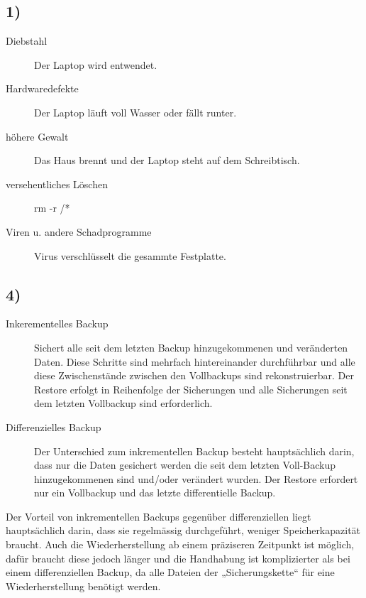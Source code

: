 \documentclass[ngerman]{fbi-aufgabenblatt}
\begin{document}
\setcounter{section}{0}
   


\subsection*{1)}
\begin{description}
	\item[Diebstahl] Der Laptop wird entwendet.
	\item [Hardwaredefekte] Der Laptop läuft voll Wasser oder fällt runter.
	\item [höhere Gewalt] Das Haus brennt und der Laptop steht auf dem Schreibtisch.
	\item [versehentliches Löschen] rm -r /*
	\item[Viren u. andere Schadprogramme] Virus verschlüsselt die gesammte Festplatte.
\end{description} 

\subsection*{4)}
\begin{description}
	\item[Inkerementelles Backup] 
	Sichert alle seit dem letzten Backup hinzugekommenen und veränderten Daten.
	Diese Schritte sind mehrfach hintereinander durchführbar und alle diese Zwischenstände zwischen den Vollbackups sind rekonstruierbar. Der Restore erfolgt in Reihenfolge der Sicherungen und alle Sicherungen seit dem letzten Vollbackup sind erforderlich. 
	
	\item [Differenzielles Backup] 
	Der Unterschied zum inkrementellen Backup besteht hauptsächlich darin, dass nur die Daten gesichert werden die seit dem letzten Voll-Backup hinzugekommenen sind und/oder verändert wurden.
	Der Restore erfordert nur ein Vollbackup und das letzte differentielle Backup. 
\end{description} 

Der Vorteil von inkrementellen Backups gegenüber differenziellen liegt hauptsächlich darin, dass sie regelmässig durchgeführt, weniger Speicherkapazität braucht. Auch die Wiederherstellung ab einem präziseren Zeitpunkt ist möglich,  dafür braucht diese jedoch länger und die Handhabung ist komplizierter als bei einem differenziellen Backup, da alle Dateien der „Sicherungskette“ für eine Wiederherstellung benötigt werden.


\end{document}
